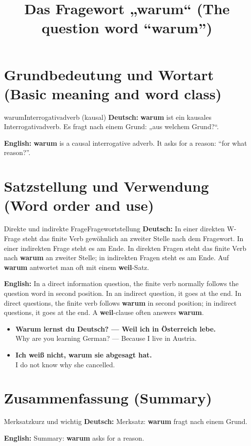 \documentclass[a4paper,11pt]{article}
\title{Das Fragewort „warum“ (The question word “warum”)}
\date{}
\newcommand{\GermanText}[1]{\textbf{Deutsch: }#1\par}
\newcommand{\EnglishText}[1]{{\small\color{SoftGray}\textbf{English: }#1\par}}
\newcommand{\ExampleItem}[2]{\item \textbf{#1}\\{\small\color{SoftGray}#2}}
\begin{document}
\maketitle
\tableofcontents
\newpage
\section{Grundbedeutung und Wortart (Basic meaning and word class)}
\begin{grammarentry}{warum}{Interrogativadverb (kausal)}
\GermanText{\textbf{warum} ist ein kausales Interrogativadverb. Es fragt nach einem Grund: „aus welchem Grund?“.}
\EnglishText{\textbf{warum} is a causal interrogative adverb. It asks for a reason: “for what reason?”.}

\end{grammarentry}
\section{Satzstellung und Verwendung (Word order and use)}
\begin{grammarentry}{Direkte und indirekte Frage}{Fragewortstellung}
\GermanText{In einer direkten W-Frage steht das finite Verb gewöhnlich an zweiter Stelle nach dem Fragewort. In einer indirekten Frage steht es am Ende. In direkten Fragen steht das finite Verb nach \textbf{warum} an zweiter Stelle; in indirekten Fragen steht es am Ende. Auf \textbf{warum} antwortet man oft mit einem \textbf{weil}-Satz.}
\EnglishText{In a direct information question, the finite verb normally follows the question word in second position. In an indirect question, it goes at the end. In direct questions, the finite verb follows \textbf{warum} in second position; in indirect questions, it goes at the end. A \textbf{weil}-clause often answers \textbf{warum}.}
\end{grammarentry}
\begin{exbox}\begin{itemize}
\ExampleItem{Warum lernst du Deutsch? — Weil ich in Österreich lebe.}{Why are you learning German? — Because I live in Austria.}
\ExampleItem{Ich weiß nicht, warum sie abgesagt hat.}{I do not know why she cancelled.}
\end{itemize}\end{exbox}
\section{Zusammenfassung (Summary)}
\begin{grammarentry}{Merksatz}{kurz und wichtig}
\GermanText{Merksatz: \textbf{warum} fragt nach einem Grund.}
\EnglishText{Summary: \textbf{warum} asks for a reason.}
\end{grammarentry}
\end{document}
